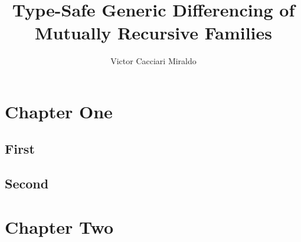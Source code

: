 \documentclass[10pt,b5paper,draft,noseaweed]{uustthesis}
\title{Type-Safe Generic Differencing of Mutually Recursive Families}
\author{Victor Cacciari Miraldo}
\begin{document}
\maketitle
\frontmatter
\tableofcontents
\mainmatter

\chapter{Chapter One}

\section{First}
\lipsum[1-10]

\section{Second}
\lipsum[11-20]

\chapter{Chapter Two}
\lipsum[21-40]
\end{document}
